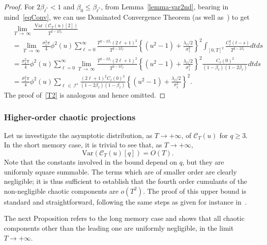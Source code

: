 \documentclass[10pt]{amsart}
\theoremstyle{definition}\newtheorem{defi}[theo]{Definition}\newtheorem{rema}[theo]{Remark}\newtheorem{exam}[theo]{Example}\newtheorem{exem}[theo]{Example}\newtheorem{nota}[theo]{Notation}
\newcommand{\clI}{\mathcal{I}}
\newcommand{\clC}{\mathcal{C}}
\DeclareMathOperator{\Var}{Var}
\begin{document}
\begin{proof}
For $2\beta_{\ell^*}<1$ and $\beta_0\le \beta_{\ell^*}$, from Lemma~\ref {lemma-var2nd}, bearing in mind~\eqref{eqConv}, we can use Dominated Convergence Theorem (as well as~\cite[Lemmas~4.7 and~4.8]{MRV:20}) to get
\begin{align*}
&\lim_{T\,\to\,\infty}\frac{\Var\left(\clC_T (u)[2]\right)}{T^{2-2\beta_{\ell^\star}}}\\
&= \lim_{T\,\to\,\infty} \frac{\sigma _{1}^{2}\pi }{4}\phi ^{2}(u)\sum_{\ell=0}^{\infty}\frac{T^{2-2\beta_{\ell}}(2\ell+1)^{2}}{T^{2-2\beta _{\ell^\star}}}\left\{\left(u^{2}-1\right)+\frac{\lambda _{\ell}/2}{\sigma_{1}^{2}}\right\}^2 \int_{[0,T]^2}\frac{C_{\ell }^{2}(t-s)}{T^{2-2\beta _{\ell }}}dtds\\
&= \frac{\sigma _{1}^{2}\pi }{4}\phi ^{2}(u)\sum_{\ell=0}^{\infty}\lim_{T\,\to\,\infty} \frac{T^{2-2\beta_{\ell}}(2\ell+1)^{2}}{T^{2-2\beta _{\ell^\star}}}\left\{\left(u^{2}-1\right)+\frac{\lambda _{\ell}/2}{\sigma_{1}^{2}}\right\}^2 \frac{C_{\ell }(0)^{2}}{(1-\beta_{\ell})(1-2\beta_{\ell})}dtds\\
&= \frac{\sigma _{1}^{2}\pi }{4}\phi ^{2}(u)\sum_{\ell\,\in\,\clI^\star}\frac{(2\ell+1)^{2}C_\ell(0)^2}{(1-2\beta_\ell)(1-\beta_\ell)}\left\{ \left(u^{2}-1\right)+\frac{\lambda _{\ell}/2}{\sigma_{1}^{2}}\right\}^2.
\end{align*}
The proof of~\eqref{T2} is analogous and hence omitted.
\end{proof}

\subsubsection{Higher-order chaotic projections}
\label{high}

Let us investigate the asymptotic distribution, as $T\to +\infty$, of $
\clC_T(u)$ for $q\ge 3$. In the short memory case, it is trivial to see that, as $T\to +\infty$,
\begin{equation*}
\text{Var}(\clC_T(u)[q]) = O(T).
\end{equation*}
Note that the constants involved in the bound depend on $q$, but they are uniformly square summable. The terms which are of smaller order are clearly negligible; it is thus sufficient to establish that the fourth order cumulants of the non-negligible chaotic components are $o(T^2)$. The proof of this upper bound is standard and straightforward, following the same steps as given for instance in~\cite{MRV:20}.

The next Proposition refers to the long memory case and shows that all chaotic components other than the leading one are uniformly negligible, in the limit $T\to +\infty$.
\end{document}

